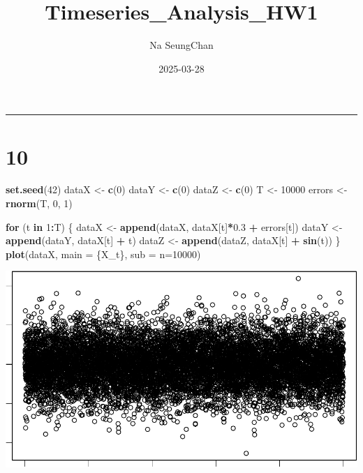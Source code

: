 \documentclass[
]{article}
\title{Timeseries\_Analysis\_HW1}
\author{Na SeungChan}
\date{2025-03-28}
\newenvironment{Shaded}{\begin{snugshade}}{\end{snugshade}}
\newcommand{\AttributeTok}[1]{\textcolor[rgb]{0.13,0.29,0.53}{#1}}
\newcommand{\ControlFlowTok}[1]{\textcolor[rgb]{0.13,0.29,0.53}{\textbf{#1}}}
\newcommand{\DecValTok}[1]{\textcolor[rgb]{0.00,0.00,0.81}{#1}}
\newcommand{\FloatTok}[1]{\textcolor[rgb]{0.00,0.00,0.81}{#1}}
\newcommand{\FunctionTok}[1]{\textcolor[rgb]{0.13,0.29,0.53}{\textbf{#1}}}
\newcommand{\NormalTok}[1]{#1}
\newcommand{\OtherTok}[1]{\textcolor[rgb]{0.56,0.35,0.01}{#1}}
\newcommand{\SpecialCharTok}[1]{\textcolor[rgb]{0.81,0.36,0.00}{\textbf{#1}}}
\newcommand{\StringTok}[1]{\textcolor[rgb]{0.31,0.60,0.02}{#1}}
\begin{document}
\maketitle

\begin{center}\rule{0.5\linewidth}{0.5pt}\end{center}

\section{10}\label{section}

\begin{Shaded}
\begin{Highlighting}[]
\FunctionTok{set.seed}\NormalTok{(}\DecValTok{42}\NormalTok{)}
\NormalTok{dataX }\OtherTok{\textless{}{-}} \FunctionTok{c}\NormalTok{(}\DecValTok{0}\NormalTok{)}
\NormalTok{dataY }\OtherTok{\textless{}{-}} \FunctionTok{c}\NormalTok{(}\DecValTok{0}\NormalTok{)}
\NormalTok{dataZ }\OtherTok{\textless{}{-}} \FunctionTok{c}\NormalTok{(}\DecValTok{0}\NormalTok{)}
\NormalTok{T }\OtherTok{\textless{}{-}} \DecValTok{10000}
\NormalTok{errors }\OtherTok{\textless{}{-}} \FunctionTok{rnorm}\NormalTok{(T, }\DecValTok{0}\NormalTok{, }\DecValTok{1}\NormalTok{)}

\ControlFlowTok{for}\NormalTok{ (t }\ControlFlowTok{in} \DecValTok{1}\SpecialCharTok{:}\NormalTok{T) \{}
\NormalTok{  dataX }\OtherTok{\textless{}{-}} \FunctionTok{append}\NormalTok{(dataX, dataX[t]}\SpecialCharTok{*}\FloatTok{0.3} \SpecialCharTok{+}\NormalTok{ errors[t])}
\NormalTok{  dataY }\OtherTok{\textless{}{-}} \FunctionTok{append}\NormalTok{(dataY, dataX[t] }\SpecialCharTok{+}\NormalTok{ t)}
\NormalTok{  dataZ }\OtherTok{\textless{}{-}} \FunctionTok{append}\NormalTok{(dataZ, dataX[t] }\SpecialCharTok{+} \FunctionTok{sin}\NormalTok{(t))}
\NormalTok{\}}
\FunctionTok{plot}\NormalTok{(dataX, }\AttributeTok{main =} \StringTok{\textquotesingle{}\{X\_t\}\textquotesingle{}}\NormalTok{, }\AttributeTok{sub =} \StringTok{\textquotesingle{}n=10000\textquotesingle{}}\NormalTok{)}
\end{Highlighting}
\end{Shaded}

\begin{center}\includegraphics[width=0.8\linewidth]{R_timeseries_HW1_files/figure-latex/unnamed-chunk-1-1} \end{center}
\end{document}
